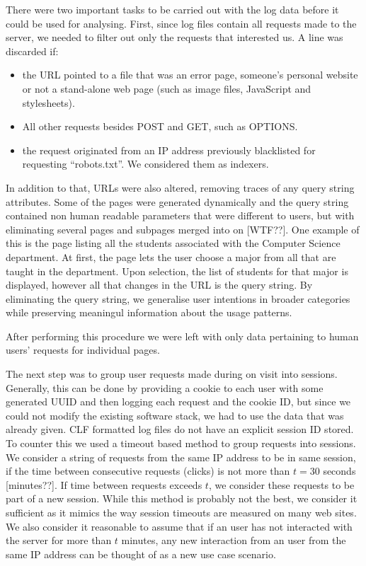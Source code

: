\documentclass{article}
\begin{document}
There were two important tasks to be carried out with the log data before it
could be used for analysing. First, since log files contain all requests made
to the server, we needed to filter out only the requests that interested us. A
line was discarded if:
\begin{itemize}
  \item the URL pointed to a file that was an error page, someone's personal
  website or not a stand-alone web page (such as image files, JavaScript and
  stylesheets).
  
  \item All other requests besides POST and GET, such as OPTIONS.
  
  \item the request originated from an IP address previously blacklisted for
  requesting ``robots.txt''. We considered them as indexers.
\end{itemize}
In addition to that, URLs were also altered, removing traces of any query
string attributes. Some of the pages were generated dynamically and the query
string contained non human readable parameters that were different to users,
but with eliminating several pages and subpages merged into on [WTF??]. One
example of this is the page listing all the students associated with the
Computer Science department. At first, the page lets the user choose a major
from all that are taught in the department. Upon selection, the list of
students for that major is displayed, however all that changes in the URL is
the query string. By eliminating the query string, we generalise user
intentions in broader categories while preserving meaningul information about
the usage patterns.

After performing this procedure we were left with only data pertaining to
human users' requests for individual pages.

The next step was to group user requests made during on visit into sessions.
Generally, this can be done by providing a cookie to each user with some
generated UUID and then logging each request and the cookie ID, but since we
could not modify the existing software stack, we had to use the data that was
already given. CLF formatted log files do not have an explicit session ID
stored. To counter this we used a timeout based method to group requests into
sessions. We consider a string of requests from the same IP address to be in
same session, if the time between consecutive requests (clicks) is not more
than $t = 30$ seconds [minutes??]. If time between requests exceeds $t$, we
consider these requests to be part of a new session. While this method is
probably not the best, we consider it sufficient as it mimics the way session
timeouts are measured on many web sites. We also consider it reasonable to
assume that if an user has not interacted with the server for more than $t$
minutes, any new interaction from an user from the same IP address can be
thought of as a new use case scenario.
\end{document}
